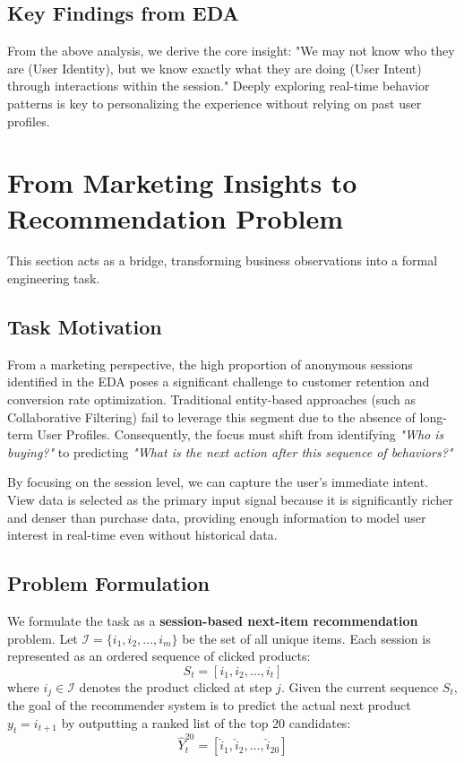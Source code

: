 \documentclass[conference]{IEEEtran}
\begin{document}
\subsection{Key Findings from EDA}
From the above analysis, we derive the core insight: "We may not know who they are (User Identity), but we know exactly what they are doing (User Intent) through interactions within the session." Deeply exploring real-time behavior patterns is key to personalizing the experience without relying on past user profiles.
\section{From Marketing Insights to Recommendation Problem}

This section acts as a bridge, transforming business observations into a formal engineering task. 

\subsection{Task Motivation}
From a marketing perspective, the high proportion of anonymous sessions identified in the EDA poses a significant challenge to customer retention and conversion rate optimization. Traditional entity-based approaches (such as Collaborative Filtering) fail to leverage this segment due to the absence of long-term User Profiles. Consequently, the focus must shift from identifying \textit{"Who is buying?"} to predicting \textit{"What is the next action after this sequence of behaviors?"} 

By focusing on the session level, we can capture the user's immediate intent. View data is selected as the primary input signal because it is significantly richer and denser than purchase data, providing enough information to model user interest in real-time even without historical data.

\subsection{Problem Formulation}
We formulate the task as a \textbf{session-based next-item recommendation} problem. Let $\mathcal{I} = \{i_1, i_2, \dots, i_m\}$ be the set of all unique items. Each session is represented as an ordered sequence of clicked products:
\[
S_t = [i_1, i_2, \dots, i_t]
\]
where $i_j \in \mathcal{I}$ denotes the product clicked at step $j$. Given the current sequence $S_t$, the goal of the recommender system is to predict the actual next product $y_t = i_{t+1}$ by outputting a ranked list of the top 20 candidates:
\[
\hat{Y}_t^{20} = [\hat{i}_1, \hat{i}_2, \dots, \hat{i}_{20}]
\]
\end{document}
